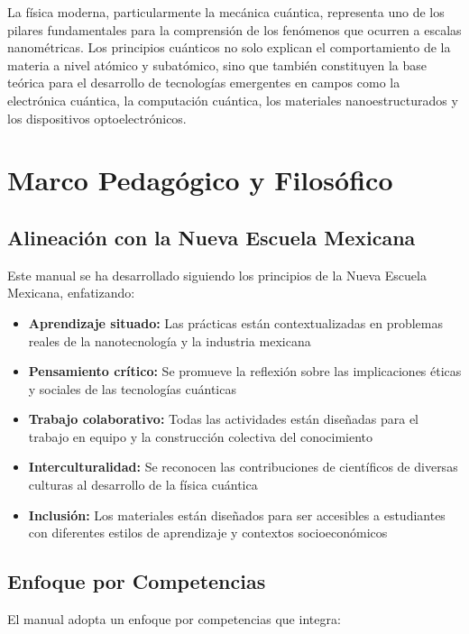 \documentclass[12pt,a4paper]{book}
\begin{document}
	La física moderna, particularmente la mecánica cuántica, representa uno de los pilares fundamentales para la comprensión de los fenómenos que ocurren a escalas nanométricas. Los principios cuánticos no solo explican el comportamiento de la materia a nivel atómico y subatómico, sino que también constituyen la base teórica para el desarrollo de tecnologías emergentes en campos como la electrónica cuántica, la computación cuántica, los materiales nanoestructurados y los dispositivos optoelectrónicos.
	
	\section{Marco Pedagógico y Filosófico}
	
	\subsection{Alineación con la Nueva Escuela Mexicana}
	
	Este manual se ha desarrollado siguiendo los principios de la Nueva Escuela Mexicana, enfatizando:
	
	\begin{itemize}
		\item \textbf{Aprendizaje situado:} Las prácticas están contextualizadas en problemas reales de la nanotecnología y la industria mexicana
		\item \textbf{Pensamiento crítico:} Se promueve la reflexión sobre las implicaciones éticas y sociales de las tecnologías cuánticas
		\item \textbf{Trabajo colaborativo:} Todas las actividades están diseñadas para el trabajo en equipo y la construcción colectiva del conocimiento
		\item \textbf{Interculturalidad:} Se reconocen las contribuciones de científicos de diversas culturas al desarrollo de la física cuántica
		\item \textbf{Inclusión:} Los materiales están diseñados para ser accesibles a estudiantes con diferentes estilos de aprendizaje y contextos socioeconómicos
	\end{itemize}
	
	\subsection{Enfoque por Competencias}
	
	El manual adopta un enfoque por competencias que integra:
	
\end{document}
